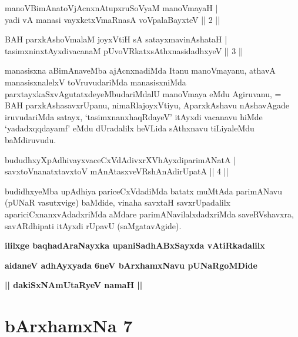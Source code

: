 \begin{shl}
manoVBimAnatoV\s jAcnxnAtupxruSoV\s yaM manoVmayaH | \\
yadi vA manasi vayxketxVmaRnasA voVpalaBayxteV \hfill ||  2 || 
\end{shl}

\begin{shl}
BAH parxkAshoV\s malaM joyxVtiH sA satayxmavinAshataH  | \\
tasimxninxtAyxdivacanaM pUvoVRkatxsAthxnasidadhxyeV \hfill ||  3 || 
\end{shl}

\begin{artha}
manasisxna aBimAnaveMba ajAcnxnadiMda Itanu manoVmayanu, athavA manasisxnalelxV toVruvudariMda manasisxniMda parxtayxkaSxvAgutatxdeyeMbudariMdalU manoVmaya eMdu Agiruvanu, = BAH parxkAshasavxrUpanu, nimaRlajoyxVtiyu, AparxkAshavu nAshavAgade iruvudariMda satayx, `tasimxnanxhaqRdayeV' itAyxdi vacanavu hiMde `yadadxqqdayamf' eMdu dUradalilx heVLida sAthxnavu tiLiyaleMdu baMdiruvudu.
\end{artha}


\begin{shl}
bududhxyXpAdhivayxvaceCxVdAdivxrXVhAyxdiparimANatA | \\
savxtoV\s nanatxtavxtoV mAnAtasxveVRshAnAdirUpatA \hfill ||  4 || 
\end{shl}

\begin{artha}
budidhxyeMba upAdhiya pariceCxVdadiMda batatx muMtAda parimANavu (pUNaR vasutxvige) baMdide, vinaha savxtaH savxrUpadalilx apariciCxnanxvAdadxriMda aMdare parimANavilalxdadxriMda saveRVshavxra, savARdhipati itAyxdi rUpavU (saMgatavAgide).
\end{artha}

\begin{center}
{\bf ililxge baqhadAraNayxka upaniSadhABxSayxda vAtiRkadalilx}
\smallskip

{\bf aidaneV adhAyxyada 6neV bArxhamxNavu pUNaRgoMDide}
\smallskip

{\bf || dakiSxNAmUtaRyeV namaH ||}
\end{center}

\section*{bArxhamxNa 7}

